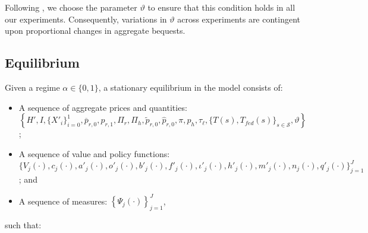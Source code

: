 \documentclass[parskip=full]{article}
\begin{document}
\noindent Following \citet{kkk-2021}, we choose the parameter $\vartheta$ to ensure that this condition holds in all our experiments. Consequently, variations in $\vartheta$ across experiments are contingent upon proportional changes in aggregate bequests.

\subsection{Equilibrium}
Given a regime $\alpha \in \{0,1\}$, a stationary equilibrium in the model consists of: 
\begin{itemize}
   \item A sequence of aggregate prices and quantities:\\   
    $\left\{H',I,\{X'_{i}\}_{i=0}^{1},\overline{p}_{r,0}, p_{r,1}, \Pi_r, \Pi_h, \tilde{p}_{r,0}, \hat{p}_{r,0}, \pi, p_h, \tau_{\ell}, \{T(s), T_{fed}(s)\}_{s \in \mathcal{S}}, \vartheta \right\}$;
    \item A sequence of value and policy functions: \\
    $\biggl\{V_{j}(\cdot),c_{j}(\cdot),a'_{j}(\cdot),o'_{j}(\cdot),b'_{j}(\cdot),f'_{j}(\cdot),\iota'_{j}(\cdot),h'_{j}(\cdot),m'_{j}(\cdot),n_{j}(\cdot),q'_{j}(\cdot)\biggr\}_{j=1}^J$; and
    \item A sequence of measures: 
     $\left\{\Psi_{j}(\cdot)\right\}_{j=1}^J$,
\end{itemize}
\noindent such that:
\end{document}
